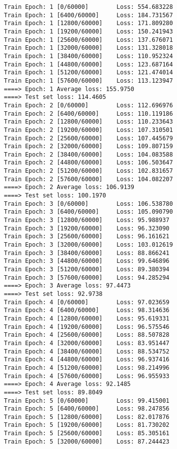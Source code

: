 \documentclass[11pt]{article}
\begin{document}
    \begin{Verbatim}[commandchars=\\\{\}]
Train Epoch: 1 [0/60000]        Loss: 554.683228
Train Epoch: 1 [6400/60000]     Loss: 184.731567
Train Epoch: 1 [12800/60000]    Loss: 171.809280
Train Epoch: 1 [19200/60000]    Loss: 150.241943
Train Epoch: 1 [25600/60000]    Loss: 137.676071
Train Epoch: 1 [32000/60000]    Loss: 131.328018
Train Epoch: 1 [38400/60000]    Loss: 110.952324
Train Epoch: 1 [44800/60000]    Loss: 123.687164
Train Epoch: 1 [51200/60000]    Loss: 121.474014
Train Epoch: 1 [57600/60000]    Loss: 113.123947
====> Epoch: 1 Average loss: 155.9750
====> Test set loss: 114.4605
Train Epoch: 2 [0/60000]        Loss: 112.696976
Train Epoch: 2 [6400/60000]     Loss: 110.119186
Train Epoch: 2 [12800/60000]    Loss: 110.233643
Train Epoch: 2 [19200/60000]    Loss: 107.310501
Train Epoch: 2 [25600/60000]    Loss: 107.445679
Train Epoch: 2 [32000/60000]    Loss: 109.807159
Train Epoch: 2 [38400/60000]    Loss: 104.083588
Train Epoch: 2 [44800/60000]    Loss: 106.503647
Train Epoch: 2 [51200/60000]    Loss: 102.831657
Train Epoch: 2 [57600/60000]    Loss: 104.082207
====> Epoch: 2 Average loss: 106.9139
====> Test set loss: 100.1970
Train Epoch: 3 [0/60000]        Loss: 106.538780
Train Epoch: 3 [6400/60000]     Loss: 105.090790
Train Epoch: 3 [12800/60000]    Loss: 95.988937
Train Epoch: 3 [19200/60000]    Loss: 96.323090
Train Epoch: 3 [25600/60000]    Loss: 96.161621
Train Epoch: 3 [32000/60000]    Loss: 103.012619
Train Epoch: 3 [38400/60000]    Loss: 88.866241
Train Epoch: 3 [44800/60000]    Loss: 99.646896
Train Epoch: 3 [51200/60000]    Loss: 89.380394
Train Epoch: 3 [57600/60000]    Loss: 94.285294
====> Epoch: 3 Average loss: 97.4473
====> Test set loss: 92.9738
Train Epoch: 4 [0/60000]        Loss: 97.023659
Train Epoch: 4 [6400/60000]     Loss: 98.314636
Train Epoch: 4 [12800/60000]    Loss: 95.619331
Train Epoch: 4 [19200/60000]    Loss: 96.575546
Train Epoch: 4 [25600/60000]    Loss: 88.507828
Train Epoch: 4 [32000/60000]    Loss: 83.951447
Train Epoch: 4 [38400/60000]    Loss: 88.534752
Train Epoch: 4 [44800/60000]    Loss: 96.937416
Train Epoch: 4 [51200/60000]    Loss: 98.214996
Train Epoch: 4 [57600/60000]    Loss: 96.955933
====> Epoch: 4 Average loss: 92.1485
====> Test set loss: 89.8049
Train Epoch: 5 [0/60000]        Loss: 99.415001
Train Epoch: 5 [6400/60000]     Loss: 98.247856
Train Epoch: 5 [12800/60000]    Loss: 82.017876
Train Epoch: 5 [19200/60000]    Loss: 81.730202
Train Epoch: 5 [25600/60000]    Loss: 85.305161
Train Epoch: 5 [32000/60000]    Loss: 87.244423

\end{Verbatim}
\end{document}
